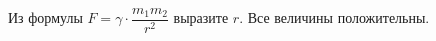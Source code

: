 \begin{ex}
	\begin{condition}
		Из формулы \( F=\gamma\cdot\dfrac{m_1m_2}{r^2} \) выразите \( r \). Все величины положительны.
	\end{condition}
\end{ex}
